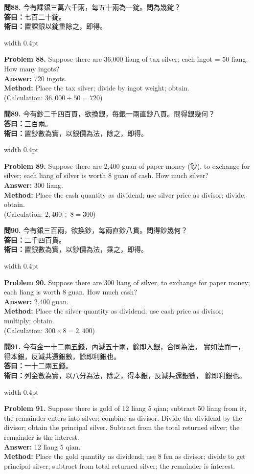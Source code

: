 \documentclass[10pt,a4paper]{article}
\newlength{\cnwidth}
\newlength{\enwidth}
\newcommand{\bilingual}[2]{%
  \noindent%
  \begin{minipage}[t]{\cnwidth}%
    #1%
  \end{minipage}%
  \hfill\vrule width 0.4pt\hfill%
  \begin{minipage}[t]{\enwidth}%
    #2%
  \end{minipage}%
  \par\smallskip%
}
\begin{document}
\bilingual{%
  \textbf{問88.}
  今有課銀三萬六千兩，每五十兩為一錠。問為幾錠？\\
  \textbf{答曰：}七百二十錠。\\
  \textbf{術曰：}置課銀以錠重除之，即得。
}{%
  \textbf{Problem 88.}
  Suppose there are 36,000 liang of tax silver; each ingot = 50 liang.
  How many ingots?\\
  \textbf{Answer:} 720 ingots.\\
  \textbf{Method:} Place the tax silver; divide by ingot weight; obtain.\\
  (Calculation: $36{,}000 \div 50 = 720$)
}

\bilingual{%
  \textbf{問89.}
  今有鈔二千四百貫，欲換銀，每銀一兩直鈔八貫。問得銀幾何？\\
  \textbf{答曰：}三百兩。\\
  \textbf{術曰：}置鈔數為實，以銀價為法，除之，即得。
}{%
  \textbf{Problem 89.}
  Suppose there are 2,400 guan of paper money (鈔), to exchange for silver;
  each liang of silver is worth 8 guan of cash. How much silver?\\
  \textbf{Answer:} 300 liang.\\
  \textbf{Method:} Place the cash quantity as dividend; use silver price as divisor;
  divide; obtain.\\
  (Calculation: $2{,}400 \div 8 = 300$)
}

\bilingual{%
  \textbf{問90.}
  今有銀三百兩，欲換鈔，每兩直鈔八貫。問得鈔幾何？\\
  \textbf{答曰：}二千四百貫。\\
  \textbf{術曰：}置銀數為實，以鈔價為法，乘之，即得。
}{%
  \textbf{Problem 90.}
  Suppose there are 300 liang of silver, to exchange for paper money;
  each liang is worth 8 guan. How much cash?\\
  \textbf{Answer:} 2,400 guan.\\
  \textbf{Method:} Place the silver quantity as dividend; use cash price as divisor;
  multiply; obtain.\\
  (Calculation: $300 \times 8 = 2{,}400$)
}

\bilingual{%
  \textbf{問91.}
  今有金一十二兩五錢，內減五十兩，餘即入銀，合同為法。
  實如法而一，得本銀，反減共還銀數，餘即利銀也。\\
  \textbf{答曰：}一十二兩五錢。\\
  \textbf{術曰：}列金數為實，以八分為法，除之，得本銀，反減共還銀數，
  餘即利銀也。
}{%
  \textbf{Problem 91.}
  Suppose there is gold of 12 liang 5 qian; subtract 50 liang from it,
  the remainder enters into silver; combine as divisor.
  Divide the dividend by the divisor; obtain the principal silver.
  Subtract from the total returned silver; the remainder is the interest.\\
  \textbf{Answer:} 12 liang 5 qian.\\
  \textbf{Method:} Place the gold quantity as dividend; use 8 fen as divisor;
  divide to get principal silver; subtract from total returned silver;
  the remainder is interest.
}
\end{document}
